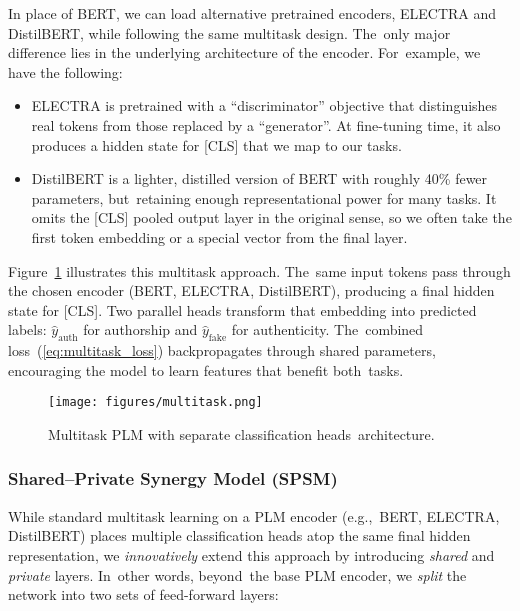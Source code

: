 \documentclass[electronics,article,accept,pdftex,moreauthors,electronics]{Definitions/mdpi}
\begin{document}
In place of BERT, we can load alternative pretrained encoders, ELECTRA and DistilBERT, while following the same multitask design. The~only major difference lies in the underlying architecture of the encoder. For~example, we have the following: %
\begin{itemize}
    \item ELECTRA is pretrained with a “discriminator” objective that distinguishes real tokens from those replaced by a “generator”. At fine-tuning time, it also produces a hidden state for [CLS] that we map to our tasks.
    \item DistilBERT is a lighter, distilled version of BERT with roughly 40\% fewer parameters, but~retaining enough representational power for many tasks. It omits the [CLS] pooled output layer in the original sense, so we often take the first token embedding or a special vector from the final layer.
\end{itemize}




Figure~\ref{fig6} illustrates this multitask approach. The~same input tokens pass through the chosen encoder (BERT, ELECTRA, DistilBERT), producing a final hidden state for [CLS]. Two parallel heads transform that embedding into predicted labels: $\hat{y}_\text{auth}$ for authorship and $\hat{y}_\text{fake}$ for authenticity. The~combined loss~(\ref{eq:multitask_loss}) backpropagates through shared parameters, encouraging the model to learn features that benefit both~tasks.

\begin{figure}[H] %
    \texttt{[image: figures/multitask.png]}
    \caption{Multitask PLM with separate classification heads~architecture.}
    \label{fig6}
\end{figure}


\subsubsection{Shared--Private Synergy Model (SPSM)}
\label{sec:shared_private}

While standard multitask learning on a PLM encoder (e.g.,~BERT, ELECTRA, DistilBERT) 
places multiple classification heads atop the same final hidden representation, we \textit{innovatively} 
extend this approach by introducing \emph{shared} and \emph{private} layers. In~other words, beyond~the base PLM encoder, we \emph{split} the network into two sets of feed-forward layers:
\end{document}

